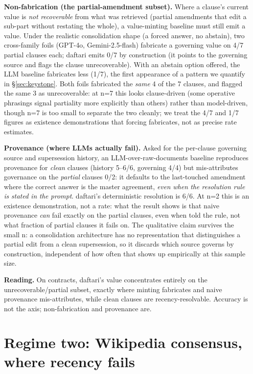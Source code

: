 \documentclass[11pt]{article}
\begin{document}
\textbf{Non-fabrication (the partial-amendment subset).} Where a clause's current value is \emph{not
recoverable} from what was retrieved (partial amendments that edit a sub-part without
restating the whole), a value-minting baseline must still emit a value. Under the realistic
consolidation shape (a forced answer, no abstain), two cross-family foils (GPT-4o,
Gemini-2.5-flash) fabricate a governing value on 4/7 partial clauses each; daftari emits
0/7 by construction (it points to the governing source and flags the clause
unrecoverable). With an abstain option offered, the LLM baseline fabricates less (1/7), the
first appearance of a pattern we quantify in \S\ref{sec:keystone}. Both foils fabricated the \emph{same} 4 of the 7
clauses, and flagged the same 3 as unrecoverable: at n=7 this looks clause-driven (some
operative phrasings signal partiality more explicitly than others) rather than model-driven,
though n=7 is too small to separate the two cleanly; we treat the 4/7 and 1/7 figures as
existence demonstrations that forcing fabricates, not as precise rate estimates.

\textbf{Provenance (where LLMs actually fail).} Asked for the per-clause governing source and
supersession history, an LLM-over-raw-documents baseline reproduces provenance for \emph{clean}
clauses (history 5--6/6, governing 4/4) but mis-attributes governance on the \emph{partial}
clauses 0/2: it defaults to the last-touched amendment where the correct answer is the
master agreement, \emph{even when the resolution rule is stated in the prompt}. daftari's
deterministic resolution is 6/6. At n=2 this is an existence demonstration, not a rate:
what the result shows is that naive provenance \emph{can} fail exactly on the partial clauses,
even when told the rule, not what fraction of partial clauses it fails on. The qualitative
claim survives the small n: a consolidation architecture has no representation that
distinguishes a partial edit from a clean supersession, so it discards which source governs
by construction, independent of how often that shows up empirically at this sample size.

\textbf{Reading.} On contracts, daftari's value concentrates entirely on the unrecoverable/partial
subset, exactly where minting fabricates and naive provenance mis-attributes, while clean
clauses are recency-resolvable. Accuracy is not the axis; non-fabrication and provenance are.

\section{Regime two: Wikipedia consensus, where recency fails}
\label{sec:wikipedia}
\end{document}
